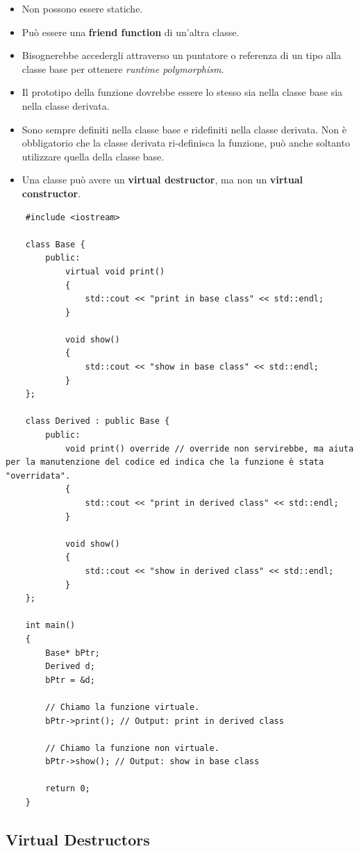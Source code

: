\begin{itemize}
	\item \textsf{\small Non possono essere statiche.}
	\item \textsf{\small Può essere una \textbf{friend function} di un'altra classe.}
	\item \textsf{\small Bisognerebbe accedergli attraverso un puntatore o referenza di un tipo alla classe base per ottenere \emph{runtime polymorphism}.}
	\item \textsf{\small Il prototipo della funzione dovrebbe essere lo stesso sia nella classe base sia nella classe derivata.}
	\item \textsf{\small Sono sempre definiti nella classe base e ridefiniti nella classe derivata. Non è obbligatorio che la classe derivata ri-definisca la funzione, può anche soltanto utilizzare quella della classe base.}
	\item \textsf{\small Una classe può avere un \textbf{virtual destructor}, ma non un \textbf{virtual constructor}.}
\end{itemize}

\begin{lstlisting}
	#include <iostream>
	
	class Base {
		public:
			virtual void print()
			{
				std::cout << "print in base class" << std::endl;
			}
		
			void show()
			{
				std::cout << "show in base class" << std::endl;
			}
	};

	class Derived : public Base {
		public:
			void print() override // override non servirebbe, ma aiuta per la manutenzione del codice ed indica che la funzione è stata "overridata".
			{
				std::cout << "print in derived class" << std::endl;
			}
		
			void show()
			{
				std::cout << "show in derived class" << std::endl;
			}
	};

	int main()
	{
		Base* bPtr;
		Derived d;
		bPtr = &d;
		
		// Chiamo la funzione virtuale.
		bPtr->print(); // Output: print in derived class
		
		// Chiamo la funzione non virtuale.
		bPtr->show(); // Output: show in base class
		
		return 0;
	}
\end{lstlisting}

\subsection{Virtual Destructors}

